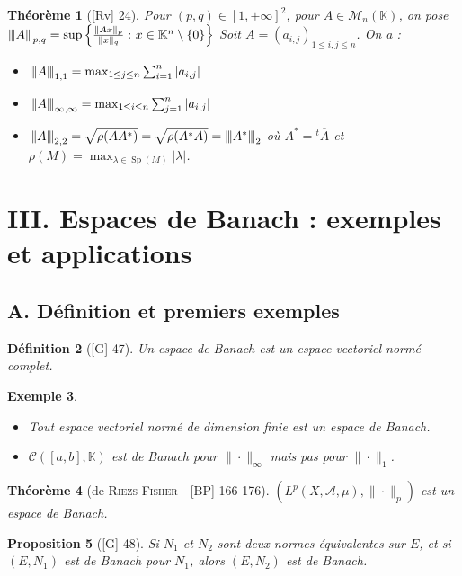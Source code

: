 \documentclass[10pt, a4paper, parskip=full, twoside, twocolumn]{report}
\newtheorem{definition}{Définition}
\newtheorem{theorem}[definition]{Théorème}
\newtheorem{proposition}[definition]{Proposition}
\newtheorem{example}[definition]{Exemple}
\newcommand{\IK}{\mathbb{K}}
\newcommand{\M}{\mathcal{M}}
\newcommand{\A}{\mathscr{A}}
\DeclareMathOperator{\Sp}{Sp}
\newcommand{\vertiii}[1]{{\left\vert\kern-0.25ex\left\vert\kern-0.25ex\left\vert #1 
    \right\vert\kern-0.25ex\right\vert\kern-0.25ex\right\vert}}
\begin{document}
\begin{theorem}[\textnormal{[Rv] 24}]
	Pour $(p,q)\in[1,+\infty]^2$, pour $A\in\M_n(\IK)$, on pose $\vertiii{A}_{p,q} = \sup\left\{\frac{\|Ax\|_p}{\|x\|_q}\,\colon x\in\IK^n\setminus \{0\}\right\}$
	Soit $A =\left(a_{i,j}\right)_{1\leq i,j\leq n}$. On a :
	\begin{itemize}
		\item $\vertiii{A}_{1,1} = \max_{1\leq j\leq n}\sum_{i=1}^{n}\vert a_{i,j}\vert$
		\item $\vertiii{A}_{\infty,\infty} = \max_{1\leq i\leq n}\sum_{j=1}^{n}\vert a_{i,j}\vert$
		\item $\vertiii{A}_{2,2} = \sqrt{\rho(AA^*)} = \sqrt{\rho(A^*A)} = \vertiii{A^*}_2$ où $A^* = {}^t\overline{A}$ et $\rho(M) = \max_{\lambda\in\Sp(M)} \vert \lambda \vert$.
	\end{itemize}
\end{theorem}

\section*{III. Espaces de Banach : exemples et applications}
\subsection*{A. Définition et premiers exemples}

\begin{definition}[\textnormal{[G] 47}]
	Un \emph{espace de Banach} est un espace vectoriel normé complet.
\end{definition}

\begin{example}
	\begin{itemize}
		\item Tout espace vectoriel normé de dimension finie est un espace de Banach.
		\item $\mathcal{C}([a,b], \IK)$ est de Banach pour $\|\cdot\|_{\infty}$ mais pas pour $\|\cdot\|_1$.
	\end{itemize}
\end{example}

\begin{theorem}[de \textsc{Riezs-Fisher} - \textnormal{[BP] 166-176}]
	$\left(L^p(X,\A,\mu), \|\cdot\|_p\right)$ est un espace de Banach.
\end{theorem}

\begin{proposition}[\textnormal{[G] 48}]
	Si $N_1$ et $N_2$ sont deux normes équivalentes sur $E$, et si $(E, N_1)$ est de Banach pour $N_1$, alors $(E,N_2)$ est de Banach.
\end{proposition}
\end{document}
